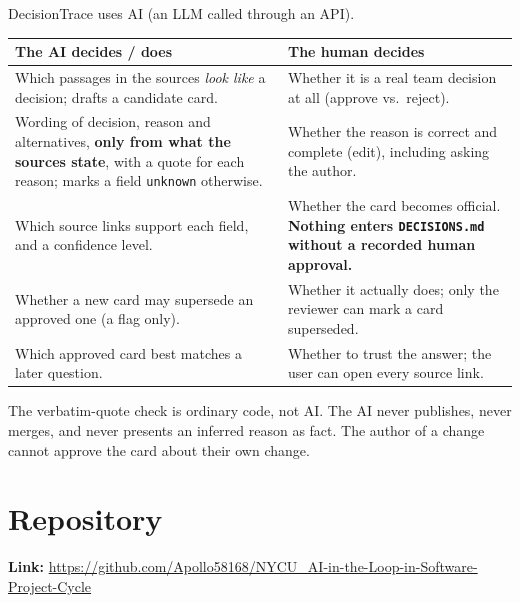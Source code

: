 \documentclass[11pt,a4paper]{article}
\newcommand{\code}[1]{\texttt{#1}}
\begin{document}
DecisionTrace uses AI (an LLM called through an API).

{\small
\begin{tabularx}{\linewidth}{@{}LL@{}}
\toprule
\textbf{The AI decides / does} & \textbf{The human decides}\\
\midrule
Which passages in the sources \emph{look like} a decision; drafts a candidate card. & Whether it is a real team decision at all (approve vs.\ reject).\\
Wording of decision, reason and alternatives, \textbf{only from what the sources state}, with a quote for each reason; marks a field \code{unknown} otherwise. & Whether the reason is correct and complete (edit), including asking the author.\\
Which source links support each field, and a confidence level. & Whether the card becomes official. \textbf{Nothing enters \code{DECISIONS.md} without a recorded human approval.}\\
Whether a new card may supersede an approved one (a flag only). & Whether it actually does; only the reviewer can mark a card superseded.\\
Which approved card best matches a later question. & Whether to trust the answer; the user can open every source link.\\
\bottomrule
\end{tabularx}
}

The verbatim-quote check is ordinary code, not AI. The AI never publishes, never merges, and never presents an inferred reason as fact. The author of a change cannot approve the card about their own change.

\section{Repository}\label{sec:repo}

\textbf{Link:} \url{https://github.com/Apollo58168/NYCU_AI-in-the-Loop-in-Software-Project-Cycle}
\end{document}
